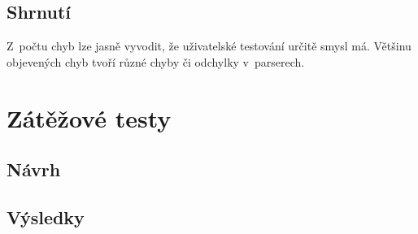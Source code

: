 
\subsection{Shrnutí}
Z~počtu chyb lze jasně vyvodit, že uživatelské testování určitě smysl má. Většinu objevených chyb tvoří různé chyby či odchylky v~parserech.





\section{Zátěžové testy}\label{zatezove_testy}

\subsection{Návrh}

\subsection{Výsledky}

